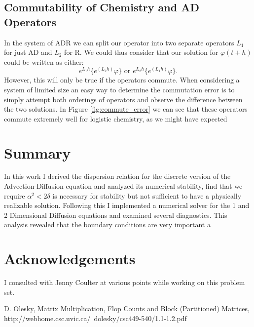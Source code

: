 \documentclass[]{article}
\begin{document}
\subsection{Commutability of Chemistry and AD Operators}
In the system of ADR we can split our operator into two separate operators $L_1$ for just AD and $L_2$ for R. We could thus consider that our solution for $\varphi(t+h)$ could be written as either:
\begin{equation}
e^{L_1h}\{e^{(L_2h)}\varphi\} \text{ or } e^{L_2h}\{e^{(L_1h)}\varphi\}.
\end{equation}
However, this will only be true if the operators commute. When considering a system of limited size an easy way to determine the commutation error is to simply attempt both orderings of operators and observe the difference between the two solutions. In Figure \ref{fig:commute_error} we can see that these operators commute extremely well for logistic chemistry, as we might have expected 
\section{Summary}
In this work I derived the dispersion relation for the discrete version of the Advection-Diffusion equation and analyzed its numerical stability, find that we require $\alpha^2 < 2\delta$ is necessary for stability but not sufficient to have a physically realizable solution. Following this I implemented a numerical solver for the 1 and 2 Dimensional Diffusion equations and examined several diagnostics. This analysis revealed that the boundary conditions are very important 
 a
\section{Acknowledgements}
I consulted with Jenny Coulter at various points while working on this problem set.

  \begin{thebibliography}{1}
  	
  	 D. Olesky, Matrix Multiplication, Flop Counts and Block (Partitioned) Matrices, http://webhome.csc.uvic.ca/~dolesky/csc449-540/1.1-1.2.pdf

  \end{thebibliography}
\end{document}
